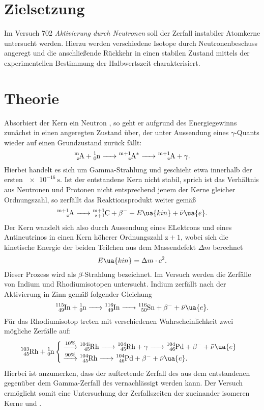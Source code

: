 \setcounter{page}{1}
\section*{Zielsetzung}
Im Versuch 702 \textit{Aktivierung durch Neutronen} soll der Zerfall instabiler Atomkerne untersucht werden.
Hierzu werden verschiedene Isotope durch Neutronenbeschuss angeregt und die anschließende Rückkehr in einen
stabilen Zustand mittels der experimentellen Bestimmung der Halbwertszeit charakterisiert.
\section{Theorie}
Absorbiert der Kern  ein Neutron , so geht er aufgrund des Energiegewinns
zunächst in einen angeregten Zustand über, der unter Aussendung eines $\gamma$-Quants wieder
auf einen Grundzustand zurück fällt:
\begin{equation}
  \ce{^m_z A + ^1_0 n -> ^{m+1}_z A^* -> ^{m+1}_z A }+ \gamma.
\end{equation}
Hierbei handelt es sich um Gamma-Strahlung und geschieht etwa innerhalb der ersten $\SI{e-16}{\second}$.
Ist der entstandene Kern 
nicht stabil, sprich ist das Verhältnis aus Neutronen und Protonen nicht entsprechend jenem der Kerne
gleicher Ordnungszahl, so zerfällt das Reaktionsprodukt weiter gemäß
\begin{equation}
  \ce{^{m+1}_z A -> ^{m+1}_{z+1} C }+ \beta^{-} + E\ua{kin} + \bar{\nu}\ua{e}.
\end{equation}
Der Kern wandelt sich also durch Aussendung eines ELektrons und eines Antineutrinos in einen Kern höherer Ordnungszahl $\mathup{z} + 1$, wobei
sich die kinetische Energie der beiden Teilchen aus dem Massendefekt $\Delta m$ berechnet
\begin{equation}
  E\ua{kin} = \Delta m \cdot c^2.
\end{equation}
Dieser Prozess wird als $\beta$-Strahlung bezeichnet. Im Versuch werden die Zerfälle von Indium und Rhodiumisotopen untersucht.
Indium zerfällt nach der Aktivierung in Zinn gemäß folgender Gleichung
\begin{equation}
  \ce{^115_49 In + ^1_0 n ->^116_49 In -> ^116_50 Sn} + \beta^- + \bar{\nu}\ua{e}.
\end{equation}
Für das Rhodiumisotop treten mit verschiedenen Wahrscheinlichkeit zwei mögliche Zerfälle auf:
\begin{equation}
\ce{^103_45 Rh + ^1_0 n} \begin{cases}
\overset{10\%}{\ce{->}} \ce{^{104i}_45 Rh -> ^{104}_45 Rh} + \gamma \ce{-> ^104_46 Pd} +  \beta^- + \bar{\nu}\ua{e}\\
\overset{90\%}{\ce{->}} \ce{^{104}_45 Rh ->  ^104_46 Pd} +  \beta^- + \bar{\nu}\ua{e}.
\end{cases}
\end{equation}
Hierbei ist anzumerken, dass der auftretende Zerfall des aus dem  entstandenen  gegenüber dem
Gamma-Zerfall des  vernachlässigt werden kann. Der Versuch ermöglicht somit eine Untersuchung der Zerfallszeiten
der zueinander isomeren Kerne  und .

